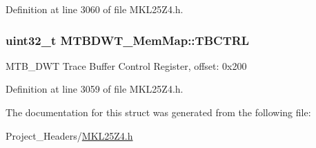 Definition at line 3060 of file M\+K\+L25\+Z4.\+h.

\subsubsection[{\texorpdfstring{T\+B\+C\+T\+RL}{TBCTRL}}]{\setlength{\rightskip}{0pt plus 5cm}uint32\+\_\+t M\+T\+B\+D\+W\+T\+\_\+\+Mem\+Map\+::\+T\+B\+C\+T\+RL}\hypertarget{struct_m_t_b_d_w_t___mem_map_a2d08a9ac507db96efebd284e02f0efe9}{}\label{struct_m_t_b_d_w_t___mem_map_a2d08a9ac507db96efebd284e02f0efe9}
M\+T\+B\+\_\+\+D\+WT Trace Buffer Control Register, offset\+: 0x200 

Definition at line 3059 of file M\+K\+L25\+Z4.\+h.



The documentation for this struct was generated from the following file\+:\begin{DoxyCompactItemize}
\item 
Project\+\_\+\+Headers/\hyperlink{_m_k_l25_z4_8h}{M\+K\+L25\+Z4.\+h}\end{DoxyCompactItemize}
